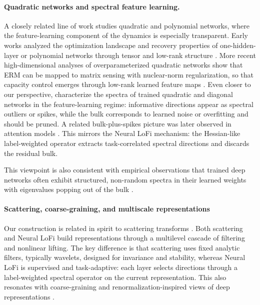 \paragraph{Quadratic networks and spectral feature learning.}
A closely related line of work studies quadratic and polynomial networks, where the feature-learning component of the dynamics is especially transparent. Early works analyzed the optimization landscape and recovery properties of one-hidden-layer or polynomial networks through tensor and low-rank structure
\cite{ge2016matrix,venturi2019spurious,saraomannelli2020optimization,arjevani2026geometry}.
More recent high-dimensional analyses of overparameterized quadratic networks show that ERM can be mapped to matrix sensing with nuclear-norm regularization, so that capacity control emerges through low-rank learned feature maps
\cite{erba2025nuclear}. Even closer to our perspective, \cite{defilippis2026scaling} characterize the spectra of trained quadratic and diagonal networks in the feature-learning regime: informative directions appear as spectral outliers or spikes, while the bulk corresponds to learned noise or overfitting and should be pruned. A related bulk-plus-spikes picture was later observed in attention models
\cite{boncoraglio2025inductive}. This mirrors the Neural LoFi mechanism: the Hessian-like label-weighted operator extracts task-correlated spectral directions and discards the residual bulk. 

This viewpoint is also consistent with empirical observations that trained deep networks often exhibit structured, non-random spectra in their learned weights with eigenvalues popping out of the bulk \cite{martin2021implicit}.


\paragraph{Scattering, coarse-graining, and multiscale representations}
Our construction is  related in spirit to scattering transforms \cite{andreux2020kymatio}. Both scattering and Neural LoFi build representations through a multilevel cascade of filtering and nonlinear lifting. The key difference is that scattering uses fixed analytic filters, typically wavelets, designed for invariance and stability, whereas Neural LoFi is supervised and task-adaptive: each layer selects directions through a label-weighted spectral operator on the current representation. This also resonates with coarse-graining and renormalization-inspired views of deep representations \cite{marchand2023multiscale}.

